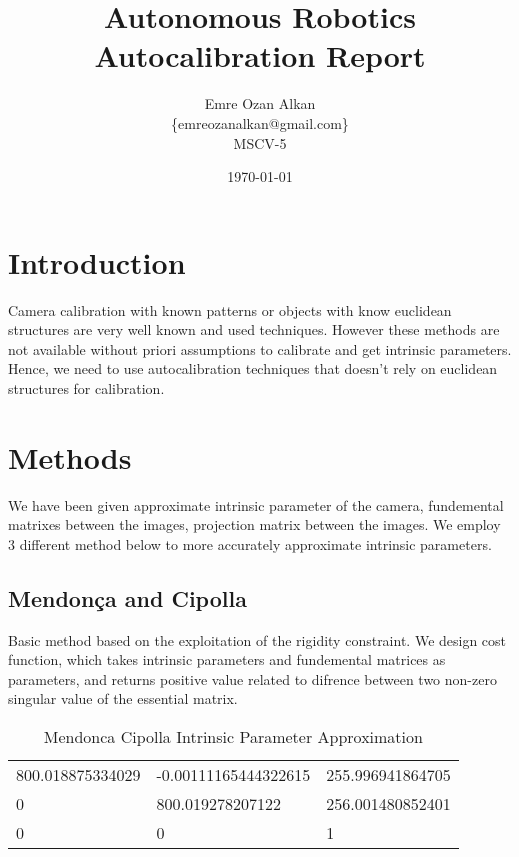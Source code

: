 \documentclass{article}
\title{Autonomous Robotics\\
		Autocalibration Report}
\author{Emre Ozan Alkan\\
		\{emreozanalkan@gmail.com\}\\
		MSCV-5}
\date{\today}
\begin{document}
\maketitle

\section{Introduction}

Camera calibration with known patterns or objects with know euclidean structures are very well known and used techniques. However these methods are not available without priori assumptions to calibrate and get intrinsic parameters. Hence, we need to use autocalibration techniques that doesn't rely on euclidean structures for calibration. 


\section{Methods}
	We have been given approximate intrinsic parameter of the camera, fundemental matrixes between the images, projection matrix between the images. We employ 3 different method below to more accurately approximate intrinsic parameters.
	
	\subsection{Mendonça and Cipolla}
		Basic method based on the exploitation of the rigidity constraint. We design cost function, which takes intrinsic parameters and fundemental matrices as parameters, and returns positive value related to difrence between two non-zero singular value of the essential matrix.		

	\begin{table}[H]
	\centering
    \begin{tabular}{lll}
    800.018875334029 & -0.00111165444322615 & 255.996941864705 \\
    0                & 800.019278207122     & 256.001480852401 \\
    0                & 0                    & 1                \\
    \end{tabular}
    \caption {Mendonca Cipolla Intrinsic Parameter Approximation}
	\end{table}
		
\end{document}
